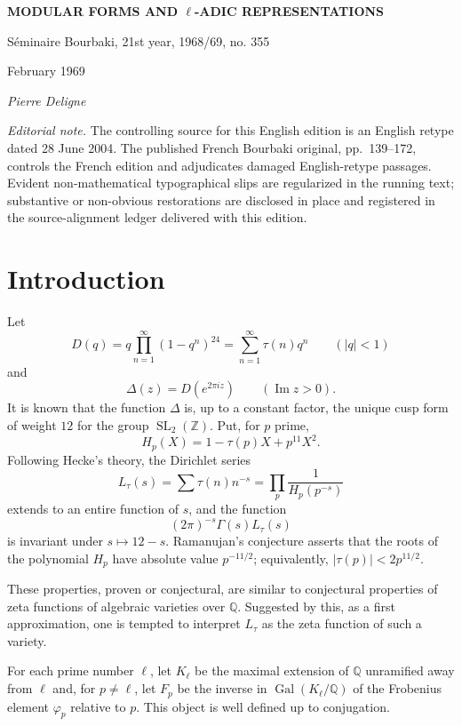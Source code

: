 \documentclass[10pt]{article}
\newcommand{\Q}{\mathbb Q}
\newcommand{\Z}{\mathbb Z}
\newcommand{\SL}{\operatorname{SL}}
\newcommand{\Gal}{\operatorname{Gal}}
\begin{document}
\begin{center}
{\Large\bfseries MODULAR FORMS AND $\ell$-ADIC REPRESENTATIONS}\par
\vspace{0.35em}
{\large Séminaire Bourbaki, 21st year, 1968/69, no. 355}\par
{\small February 1969}\par
\vspace{0.7em}
{\itshape Pierre Deligne}
\end{center}

\noindent\emph{Editorial note.} The controlling source for this English edition is an
English retype dated 28 June 2004. The published French Bourbaki original, pp.~139--172,
controls the French edition and adjudicates damaged English-retype passages. Evident
non-mathematical typographical slips are regularized in the running text; substantive or
non-obvious restorations are disclosed in place and registered in the source-alignment
ledger delivered with this edition.

\section{Introduction}

Let
\[
D(q)=q\prod_{n=1}^{\infty}(1-q^n)^{24}
     =\sum_{n=1}^{\infty}\tau(n)q^n
\qquad (|q|<1)
\]
and
\[
\Delta(z)=D(e^{2\pi iz})\qquad (\operatorname{Im} z>0).
\]
It is known that the function $\Delta$ is, up to a constant factor, the unique cusp form of
weight $12$ for the group $\SL_2(\Z)$. Put, for $p$ prime,
\[
H_p(X)=1-\tau(p)X+p^{11}X^2 .
\]
Following Hecke's theory, the Dirichlet series
\[
L_\tau(s)=\sum \tau(n)n^{-s}=\prod_p\frac{1}{H_p(p^{-s})}
\]
extends to an entire function of $s$, and the function
\[
(2\pi)^{-s}\Gamma(s)L_\tau(s)
\]
is invariant under $s\mapsto 12-s$. Ramanujan's conjecture asserts that the roots of
the polynomial $H_p$ have absolute value $p^{-11/2}$; equivalently,
$|\tau(p)|<2p^{11/2}$.

These properties, proven or conjectural, are similar to conjectural properties of zeta
functions of algebraic varieties over $\Q$. Suggested by this, as a first approximation,
one is tempted to interpret $L_\tau$ as the zeta function of such a variety.

For each prime number $\ell$, let $K_\ell$ be the maximal extension of $\Q$ unramified
away from $\ell$ and, for $p\ne\ell$, let $F_p$ be the inverse in $\Gal(K_\ell/\Q)$ of
the Frobenius element $\varphi_p$ relative to $p$. This object is well defined up to
conjugation.
\end{document}
